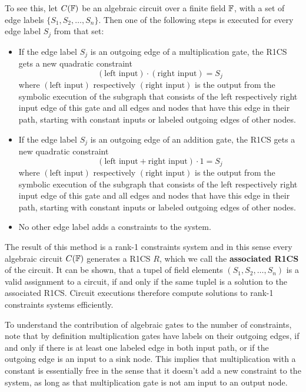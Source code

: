 To see this, let $C(\mathbb{F})$ be an algebraic circuit over a finite field $\mathbb{F}$, with a set of edge labels $\{S_1,S_2,\ldots, S_n\}$. Then one of the following steps is executed for every edge label $S_j$ from that set:
\begin{itemize}
\item If the edge label $S_j$ is an outgoing edge of a multiplication gate, the R1CS gets a new quadratic constraint
\begin{equation}
(\text{left input})\cdot (\text{right input}) = S_j
\end{equation}  
where $(\text{left input})$ respectively $(\text{right input})$ is the output from the symbolic execution of the subgraph that consists of the left respectively right input edge of this gate and all edges and nodes that have this edge in their path, starting with constant inputs or labeled outgoing edges of other nodes.
\item If the edge label $S_j$ is an outgoing edge of an addition gate, the R1CS gets a new quadratic constraint
\begin{equation}
(\text{left input} + \text{right input})\cdot 1 = S_j
\end{equation}  
where $(\text{left input})$ respectively $(\text{right input})$ is the output from the symbolic execution of the subgraph that consists of the left respectively right input edge of this gate and all edges and nodes that have this edge in their path, starting with constant inputs or labeled outgoing edges of other nodes.
\item No other edge label adds a constraints to the system.
\end{itemize}
The result of this method is a rank-1 constraints system and in this sense every algebraic circuit $C(\mathbb{F})$ generates a R1CS $R$, which we call the \textbf{associated R1CS} of the circuit. It can be shown, that a tupel of field elements $(S_1,S_2,\ldots, S_n)$ is a valid assignment to a circuit, if and only if the same tuplel is a solution to the associated R1CS. Circuit executions therefore compute solutions to rank-1 constraints systems efficiently. 

To understand the contribution of algebraic gates to the number of constraints, note that
by definition multiplication gates have labels on their outgoing edges, if and only if
there is at least one labeled edge in both input path, or if the outgoing edge is an input to a sink node. This implies that multiplication with a constant is essentially free in the sense that it doesn't add a new constraint to the system, as long as that multiplication gate is not am input to an output node. 

